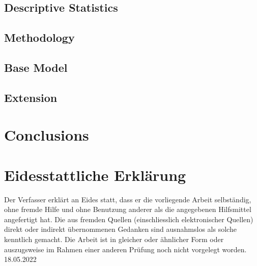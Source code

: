 \documentclass[11pt,a4paper,english,oneside]{article}
\begin{document}
\subsection{Descriptive Statistics}

\lipsum

\subsection{Methodology}

\lipsum

\citet{nyborg2019a}

\subsection{Base Model}

\lipsum

\subsection{Extension}


\lipsum


\section{Conclusions}

\lipsum



\newpage



\newpage
\thispagestyle{firststyle}
\section*{Eidesstattliche Erklärung}
Der Verfasser erklärt an Eides statt, dass er die vorliegende Arbeit selbständig, ohne fremde Hilfe und ohne Benutzung anderer als die angegebenen Hilfsmittel angefertigt hat. Die aus fremden Quellen (einschliesslich elektronischer Quellen) direkt oder indirekt übernommenen Gedanken sind ausnahmslos als solche kenntlich gemacht. Die Arbeit ist in gleicher oder ähnlicher Form oder auszugsweise im Rahmen einer anderen Prüfung noch nicht vorgelegt worden.\\[2cm]

\hspace{60pt} 18.05.2022

 \hfill {}
\end{document}
